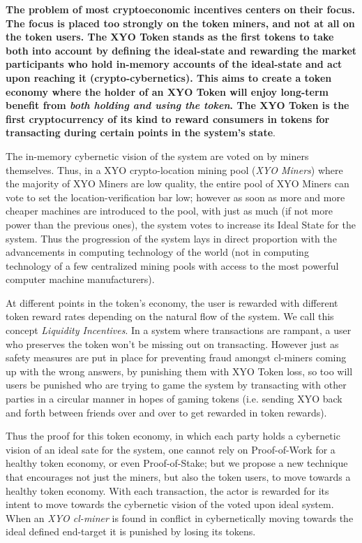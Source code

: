 \documentclass{article}
\begin{document}
\textbf{The problem of most cryptoeconomic incentives centers on their focus. The focus is placed too strongly on the token miners, and not at all on the token users. The XYO Token stands as the first tokens to take both into account by defining the ideal-state and rewarding the market participants who hold in-memory accounts of the ideal-state and act upon reaching it (crypto-cybernetics). This aims to create a token economy where the holder of an XYO Token will enjoy long-term benefit from \textit{both holding and using the token}. The XYO Token is the first cryptocurrency of its kind to reward consumers in tokens for transacting during certain points in the system's state}. 

The in-memory cybernetic vision of the system are voted on by miners themselves. Thus, in a XYO crypto-location mining pool (\textit{XYO Miners})  where the majority of XYO Miners are low quality, the entire pool of XYO Miners can vote to set the location-verification bar low; however as soon as more and more cheaper machines are introduced to the pool, with just as much (if not more power than the previous ones), the system votes to increase its Ideal State for the system. Thus the progression of the system lays in direct proportion with the advancements in computing technology of the world (not in computing technology of a few centralized mining pools with access to the most powerful computer machine manufacturers).

At different points in the token's economy, the user is rewarded with different token reward rates depending on the natural flow of the system. We call this concept \textit{Liquidity Incentives}. In a system where transactions are rampant, a user who preserves the token won't be missing out on transacting. However just as safety measures are put in place for preventing fraud amongst cl-miners coming up with the wrong answers, by punishing them with XYO Token loss, so too will users be punished who are trying to game the system by transacting with other parties in a circular manner in hopes of gaming tokens (i.e. sending XYO back and forth between friends over and over to get rewarded in token rewards).

Thus the proof for this token economy, in which each party holds a cybernetic vision of an ideal sate for the system, one cannot rely on Proof-of-Work for a healthy token economy, or even Proof-of-Stake; but we propose a new technique  that encourages not just the miners, but also the token users, to move towards a healthy token economy. With each transaction, the actor is rewarded for its intent to move towards the cybernetic vision of the voted upon ideal system.  When an \textit{XYO cl-miner} is found in conflict in cybernetically moving towards the ideal defined end-target it is punished by losing its tokens. 
\end{document}
